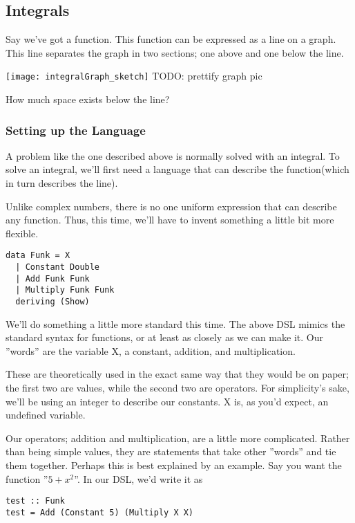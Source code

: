 


\subsection{Integrals}
Say we've got a function. This function can be expressed as a line on a graph. This line separates the graph in two sections; one above and one below the line.

\texttt{[image: integralGraph\_sketch]}
TODO: prettify graph pic

How much space exists below the line?

\subsubsection{Setting up the Language}
A problem like the one described above is normally solved with an integral. To solve an integral, we'll first need a language that can describe the function(which in turn describes the line).

Unlike complex numbers, there is no one uniform expression that can describe any function. Thus, this time, we'll have to invent something a little bit more flexible.

\begin{verbatim}
data Funk = X
  | Constant Double
  | Add Funk Funk
  | Multiply Funk Funk
  deriving (Show)
\end{verbatim}

We'll do something a little more standard this time. The above DSL mimics the standard syntax for functions, or at least as closely as we can make it. Our ''words'' are the variable X, a constant, addition, and multiplication.

These are theoretically used in the exact same way that they would be on paper; the first two are values, while the second two are operators. For simplicity's sake, we'll be using an integer to describe our constants. X is, as you'd expect, an undefined variable.

Our operators; addition and multiplication, are a little more complicated. Rather than being simple values, they are statements that take other ''words'' and tie them together. Perhaps this is best explained by an example. Say you want the function ''$5 + x^2$''. In our DSL, we'd write it as
\begin{verbatim}
test :: Funk
test = Add (Constant 5) (Multiply X X)
\end{verbatim}

